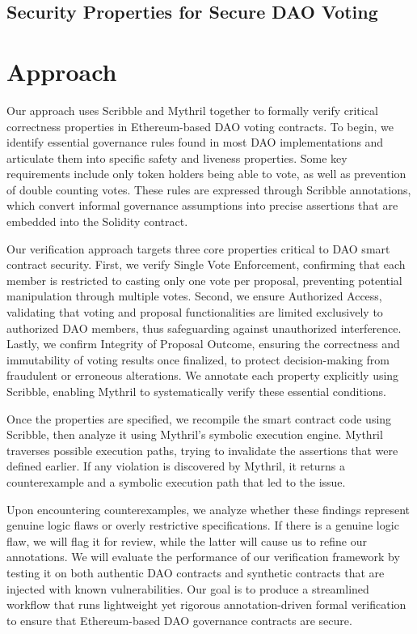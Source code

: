 \documentclass[conference]{IEEEtran}
\begin{document}
\subsection{Security Properties for Secure DAO Voting}

\section{Approach}
Our approach uses Scribble and Mythril together to formally verify critical correctness properties in Ethereum-based DAO voting contracts. To begin, we identify essential governance rules found in most DAO implementations and articulate them into specific safety and liveness properties. Some key requirements include only token holders being able to vote, as well as prevention of double counting votes. These rules are expressed through Scribble annotations, which convert informal governance assumptions into precise assertions that are embedded into the Solidity contract. 

Our verification approach targets three core properties critical to DAO smart contract security. First, we verify Single Vote Enforcement, confirming that each member is restricted to casting only one vote per proposal, preventing potential manipulation through multiple votes. Second, we ensure Authorized Access, validating that voting and proposal functionalities are limited exclusively to authorized DAO members, thus safeguarding against unauthorized interference. Lastly, we confirm Integrity of Proposal Outcome, ensuring the correctness and immutability of voting results once finalized, to protect decision-making from fraudulent or erroneous alterations. We annotate each property explicitly using Scribble, enabling Mythril to systematically verify these essential conditions.

Once the properties are specified, we recompile the smart contract code using Scribble, then analyze it using Mythril’s symbolic execution engine. Mythril traverses possible execution paths, trying to invalidate the assertions that were defined earlier. If any violation is discovered by Mythril, it returns a counterexample and a symbolic execution path that led to the issue.

Upon encountering counterexamples, we analyze whether these findings represent genuine logic flaws or overly restrictive specifications. If there is a genuine logic flaw, we will flag it for review, while the latter will cause us to refine our annotations. We will evaluate the performance of our verification framework by testing it on both authentic DAO contracts and synthetic contracts that are injected with known vulnerabilities. Our goal is to produce a streamlined workflow that runs lightweight yet rigorous annotation-driven formal verification to ensure that Ethereum-based DAO governance contracts are secure.
\end{document}
